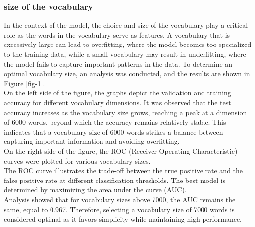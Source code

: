 \documentclass{class}
\begin{document}
\subsubsection*{size of the vocabulary}
In the context of the model, the choice and size of the vocabulary play a critical role as the words in the vocabulary serve as features.
A vocabulary that is excessively large can lead to overfitting, where the model becomes too specialized to the training data, while a small
vocabulary may result in underfitting, where the model fails to capture important patterns in the data. To determine an optimal vocabulary size,
an analysis was conducted, and the results are shown in Figure \ref{fig-1}.\\
On the left side of the figure, the graphs depict the validation and training accuracy for different vocabulary dimensions.
It was observed that the test accuracy increases as the vocabulary size grows, reaching a peak at a dimension of 6000 words,
beyond which the accuracy remains relatively stable. This indicates that a vocabulary size of 6000 words strikes a balance between capturing
important information and avoiding overfitting.\\
On the right side of the figure, the ROC (Receiver Operating Characteristic) curves were plotted for various vocabulary sizes.\\
The ROC curve illustrates the trade-off between the true positive rate and the false positive rate at different classification thresholds.
The best model is determined by maximizing the area under the curve (AUC).\\
Analysis showed that for vocabulary sizes above 7000, the AUC remains the same, equal to 0.967.
Therefore, selecting a vocabulary size of 7000 words is considered optimal as it favors simplicity while maintaining high performance.
\end{document}
